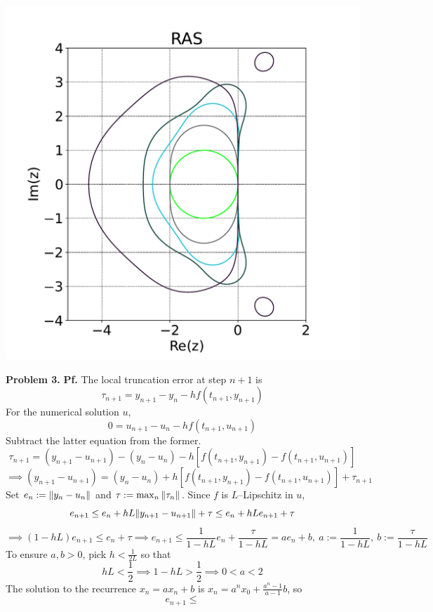 \documentclass{article}
\def\tbf#1{\textbf{#1}}
\newcommand{\pf}{\tbf{Pf. }}
\newcommand{\imp}{\implies}
\newcommand{\sep}[1][.5cm]{\vspace{#1}}
\begin{document}
\begin{center}
	\includegraphics[scale=.35]{hw2 problem 2 RAS}
\end{center}
\sep



\tbf{Problem 3.} \pf The local truncation error at step $n+1$ is
$$\tau_{n+1} = y_{n+1} - y_n - hf(t_{n+1},y_{n+1})$$
For the numerical solution $u$,
$$0 = u_{n+1} - u_n - hf(t_{n+1},u_{n+1})$$
Subtract the latter equation from the former.
$$\tau_{n+1} = (y_{n+1}-u_{n+1}) - (y_n-u_n) - h[f(t_{n+1},y_{n+1})-f(t_{n+1},u_{n+1})]$$
$$\imp (y_{n+1}-u_{n+1}) = (y_n-u_n) + h[f(t_{n+1},y_{n+1})-f(t_{n+1},u_{n+1})] + \tau_{n+1}$$
Set $e_n:=\norm{y_n-u_n}$ and $\tau:=\max_n\norm{\tau_n}$. Since $f$ is $L$--Lipschitz in $u$,
$$e_{n+1} \le e_n + hL\norm{y_{n+1}-u_{n+1}} + \tau \le e_n + hLe_{n+1} + \tau$$
$$\imp (1-hL)e_{n+1} \le e_n + \tau
\imp e_{n+1} \le \frac{1}{1-hL}e_n + \frac{\tau}{1-hL} = ae_n + b,~a:=\frac{1}{1-hL},~b:=\frac{\tau}{1-hL}$$
To ensure $a,b>0$, pick $h<\frac{1}{2L}$ so that
$$hL < \frac12 \imp 1-hL > \frac12 \imp 0 < a < 2$$
The solution to the recurrence $x_n=ax_n+b$ is $x_n=a^nx_0+\frac{a^n-1}{a-1}b$, so
$$e_{n+1} \le $$
\end{document}
